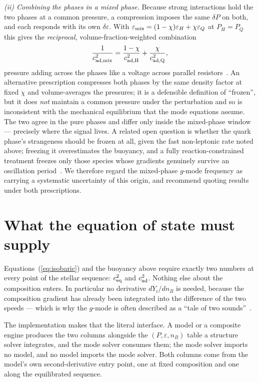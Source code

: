 \documentclass[aps,prd,twocolumn,superscriptaddress,nofootinbib,10pt]{revtex4-2}
\begin{document}
\emph{(ii) Combining the phases in a mixed phase.} Because strong interactions
hold the two phases at a common pressure, a compression imposes the same $\delta
P$ on both, and each responds with its own $\delta\varepsilon$. With
$\varepsilon_{\rm mix}=(1-\chi)\varepsilon_{H}+\chi\varepsilon_{Q}$ at
$P_{H}=P_{Q}$ this gives the \emph{reciprocal}, volume-fraction-weighted
combination
\begin{equation}
  \frac{1}{c_{\rm ad,mix}^{2}} = \frac{1-\chi}{c_{\rm ad,H}^{2}}
                               + \frac{\chi}{c_{\rm ad,Q}^{2}},
  \label{eq:isobaric}
\end{equation}
pressure adding across the phases like a voltage across parallel
resistors~\cite{Jaikumar2021}. An alternative prescription compresses both
phases by the same density factor at fixed $\chi$ and volume-averages the
pressures; it is a defensible definition of ``frozen'', but it does \emph{not}
maintain a common pressure under the perturbation and so is inconsistent with
the mechanical equilibrium that the mode equations assume. The two agree in the
pure phases and differ only inside the mixed-phase window --- precisely where
the signal lives. A related open question is whether the quark phase's
strangeness should be frozen at all, given the fast non-leptonic rate noted
above; freezing it overestimates the buoyancy, and a fully
reaction-constrained treatment freezes only those species whose gradients
genuinely survive an oscillation period~\cite{Haskell2024}. We therefore regard
the mixed-phase $g$-mode frequency as carrying a systematic uncertainty of this
origin, and recommend quoting results under both prescriptions.

\section{What the equation of state must supply}
\label{sec:contract}

Equations~(\ref{eq:isobaric}) and the buoyancy above require exactly two
numbers at every point of the stellar sequence: $c_{\rm eq}^{2}$ and
$c_{\rm ad}^{2}$. Nothing else about the composition enters. In particular no
derivative $dY_{i}/dn_{B}$ is needed, because the composition gradient has
already been integrated into the difference of the two speeds --- which is why
the $g$-mode is often described as a ``tale of two sounds''~\cite{Jaikumar2021}.

The implementation makes that the literal interface. A model or a composite
engine produces the two columns alongside the $(P,\varepsilon,n_{B})$ table a
structure solver integrates, and the mode solver consumes them; the mode solver
imports no model, and no model imports the mode solver. Both columns come from
the model's own second-derivative entry point, one at fixed composition and one
along the equilibrated sequence.
\end{document}
